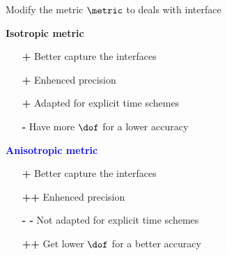 \begin{frame}[noframenumbering]{Modify the metric $\metric$ to deals with interface}


  \begin{multicols}{2}
        \large{\textbf{\textcolor{\mygreen}{Isotropic metric}}}
    \vspace{0.5cm}
    \begin{itemize}
      \item[\textcolor{\mygreen}{\textbf{+}}] Better capture the interfaces
      \item[\textcolor{\mygreen}{\textbf{+}}] Enhenced precision
      \item[\textcolor{\mygreen}{\textbf{+}}] Adapted for explicit time schemes
      \item[\textcolor{\myred}{\textbf{-}}] Have more $\dof$ for a lower accuracy
      \end{itemize}

    \columnbreak
    \large{\textbf{\textcolor{blue}{Anisotropic metric}}}
    \vspace{0.5cm}
    \begin{itemize}
      \item[\textcolor{\mygreen}{\textbf{+}}] Better capture the interfaces
      \item[\textcolor{\mygreen}{\textbf{++}}] Enhenced precision
      \item[\textcolor{\myred}{\textbf{- -}}] Not adapted for explicit time schemes
      \item[\textcolor{\mygreen}{\textbf{++}}] Get lower $\dof$ for a better accuracy
    \end{itemize}
  \end{multicols}


\end{frame}
